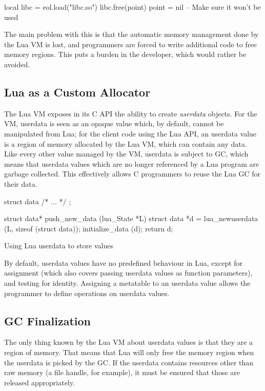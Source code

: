 \begin{luacode}
local libc = eol.load("libc.so")
libc.free(point)
point = nil  -- Make sure it won't be used
\end{luacode}

The main problem with this is that the automatic memory management done by the
Lua VM is lost, and programmers are forced to write additional code to free
memory regions. This puts a burden in the developer, which would rather be
avoided.


\subsection{Lua as a Custom Allocator}

The Lua VM exposes in its C API the ability to create \emph{userdata} objects.
For the VM, userdata is seen as an opaque value which, by default, cannot be
manipulated from Lua; for the client code using the Lua API, an userdata value
is a region of memory allocated by the Lua VM, which can contain any data.
Like every other value managed by the VM, userdata is subject to \gls{GC},
which means that userdata values which are no longer referenced by a Lua
program are garbage collected. This effectively allows C programmers to reuse
the Lua GC for their data.

\begin{listing}[H]
  \centering
  \begin{ccode}
  struct data { /* ... */ };

  struct data* push_new_data (lua_State *L) {
    struct data *d = lua_newuserdata (L, sizeof (struct data));
    initialize_data (d);
    return d;
  }
  \end{ccode}
  \caption{Using Lua userdata to store values}
  \label{lst:values-in-userdata}
\end{listing}

By default, userdata values have no predefined behaviour in Lua, except for
assignment (which also covers passing userdata values as function parameters),
and testing for identity. Assigning a metatable to an userdata value allows
the programmer to define operations on userdata values.


\subsection{GC Finalization}

The only thing known by the Lua VM about userdata values is that they are
a region of memory. That means that Lua will only free the memory region when
the userdata is picked by the \gls{GC}. If the userdata contains resources
other than raw memory (a file handle, for example), it must be ensured that
those are released appropriately.

